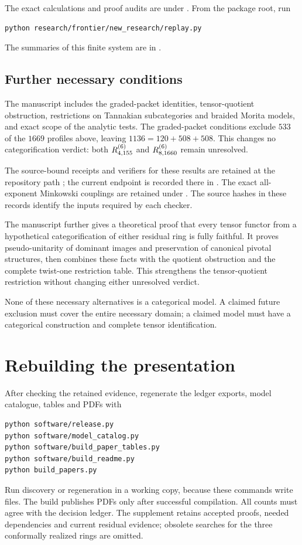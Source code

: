 \documentclass[11pt]{article}
\begin{document}
The exact calculations and proof audits are under
. From the package root, run
\begin{verbatim}
python research/frontier/new_research/replay.py
\end{verbatim}
The summaries of this finite system are in
.

\subsection{Further necessary conditions}
The manuscript includes the graded-packet identities,
tensor-quotient obstruction, restrictions on Tannakian subcategories and
braided Morita models, and exact scope of the analytic tests.
The graded-packet conditions exclude $533$ of the $1669$ profiles above,
leaving $1136=120+508+508$. This changes no categorification verdict:
both $R^{(6)}_{4,155}$ and $R^{(6)}_{8,1660}$ remain unresolved.

The source-bound receipts and verifiers for these results are retained
at the repository path
;
the current endpoint is recorded there in
.
The exact all-exponent Minkowski couplings are retained under
.
The source hashes in these records identify the inputs required by each
checker.

The manuscript further gives a theoretical proof that every tensor
functor from a hypothetical categorification of either residual ring
is fully faithful. It proves pseudo-unitarity of dominant images and
preservation of canonical pivotal structures, then combines these
facts with the quotient obstruction and the complete twist-one
restriction table. This strengthens the tensor-quotient restriction
without changing either unresolved verdict.

\begin{samepage}
None of these necessary alternatives is a categorical model. A claimed
future exclusion must cover the entire necessary domain; a claimed model
must have a categorical construction and complete tensor identification.

\section{Rebuilding the presentation}
After checking the retained evidence, regenerate the ledger exports,
model catalogue, tables and PDFs with
\begin{verbatim}
python software/release.py
python software/model_catalog.py
python software/build_paper_tables.py
python software/build_readme.py
python build_papers.py
\end{verbatim}
Run discovery or regeneration in a working copy, because these commands
write files. The build publishes PDFs only after successful compilation.
All counts must agree with the decision ledger. The supplement retains
accepted proofs, needed dependencies and current residual evidence;
obsolete searches for the three conformally realized rings are omitted.
\end{samepage}
\end{document}
